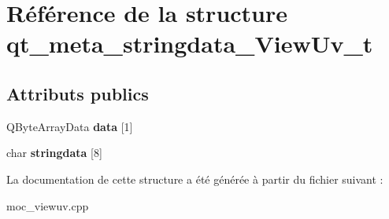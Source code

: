 \hypertarget{structqt__meta__stringdata___view_uv__t}{\section{Référence de la structure qt\+\_\+meta\+\_\+stringdata\+\_\+\+View\+Uv\+\_\+t}
\label{structqt__meta__stringdata___view_uv__t}
}
\subsection*{Attributs publics}
\begin{DoxyCompactItemize}
\item 
\hypertarget{structqt__meta__stringdata___view_uv__t_ab42cbbdbbab3a432b6540b7d3d0570b3}{Q\+Byte\+Array\+Data {\bfseries data} \mbox{[}1\mbox{]}}\label{structqt__meta__stringdata___view_uv__t_ab42cbbdbbab3a432b6540b7d3d0570b3}

\item 
\hypertarget{structqt__meta__stringdata___view_uv__t_aa930279d2eb22385ce54b9b77d0cd46f}{char {\bfseries stringdata} \mbox{[}8\mbox{]}}\label{structqt__meta__stringdata___view_uv__t_aa930279d2eb22385ce54b9b77d0cd46f}

\end{DoxyCompactItemize}


La documentation de cette structure a été générée à partir du fichier suivant \+:\begin{DoxyCompactItemize}
\item 
moc\+\_\+viewuv.\+cpp\end{DoxyCompactItemize}

